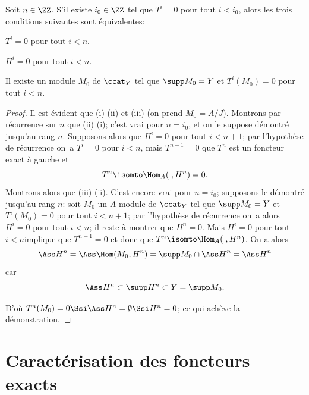 \begin{theoreme}
\label{IV.1.4} Soit $n\in \ZZ$. S'il existe $i_{0}\in \ZZ$ tel que $T^{i}=0$ pour tout $i<i_{0}$, alors les trois conditions suivantes sont \'equivalentes:
\begin{enumeratei}
\item
$T^{i}=0$ pour tout $i<n$.
\item
$H^{i}=0$ pour tout $i<n$.
\item
Il existe un module $M_{0}$ de $\ccat_{Y}$ tel que $\supp M_{0}=Y$ et $T^{i}(M_{0})=0$ pour tout $i<n$.
\end{enumeratei}
\end{theoreme}

\begin{proof}
Il est \'evident que (i)  (ii) et (iii) (on prend $M_{0}=A/J$). Montrons par r\'ecurrence sur $n$ que (ii)  (i); c'est vrai pour $n=i_{0}$, et on le suppose d\'emontr\'e jusqu'au rang $n$. Supposons alors que $H^{i}=0$ pour tout $i<n+1$; par l'hypoth\`ese de r\'ecurrence on~a $T^{i}=0$ pour $i<n$, mais $T^{n-1}=0$  que $T^{n}$ est un foncteur exact \`a gauche et
\begin{equation*} T^{n}\isomto\Hom_{A}(\;, H^{n})=0.
\end{equation*}
Montrons alors que (iii)  (ii). C'est encore vrai pour $n=i_{0}$; supposons-le d\'emontr\'e jusqu'au rang $n$: soit $M_{0}$ un $A$-module de $\ccat_{Y}$ tel que $\supp M_{0}=Y$ et $T^{i}(M_{0})=0$ pour tout $i<n+1$; par l'hypoth\`ese de r\'ecurrence on~a alors $H^{i}=0$ pour tout $i<n$; il reste \`a montrer que $H^{n}=0$. Mais \og $H^{i}=0$ pour tout $i<n$\fg implique que $T^{n-1}=0$ et donc que $T^{n}\isomto\Hom_{A}(\;, H^{n})$. On a alors
\begin{equation*}
\Ass H^{n}=\Ass \Hom(M_{0}, H^{n})=\supp M_{0}\cap \Ass H^{n}= \Ass H^{n}
\end{equation*}
car
\begin{equation*}
\Ass H^{n}\subset \supp H^{n}\subset Y= \supp M_{0}.
\end{equation*}

D'o\`u $T^{n}(M_{0})=0\Ssi \Ass H^{n}=\emptyset \Ssi H^{n}=0$; ce qui ach\`eve la d\'emonstration.
\skipqed
\end{proof}

\section{Caract\'erisation des foncteurs exacts} \label{IV.2}

